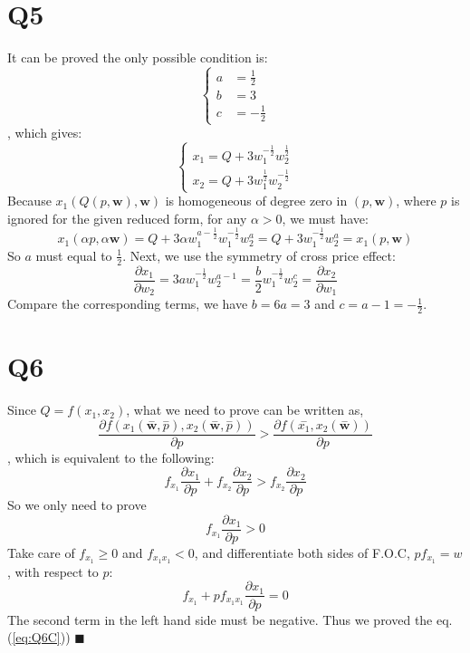 \documentclass{article}
\begin{document}
\section*{Q5}
It can be proved the only possible condition is:
\begin{equation}
	\begin{cases}
		a &= \frac{1}{2}\\
		b &= 3 \\
		c &= -\frac{1}{2}	
	\end{cases}
\end{equation}
, which gives:
\begin{equation}
	\begin{cases}
		x_1 = Q + 3w^{-\frac{1}{2}}_1 w^{\frac{1}{2}}_2		\\
		x_2 = Q + 3w^{\frac{1}{2}}_1 w^{-\frac{1}{2}}_2	
	\end{cases}
\end{equation}
Because $x_1 (Q(p,\bm{w}), \bm{w})$ is homogeneous of degree zero in $(p,\bm{w})$, where $p$ is ignored for the given reduced form, for any $\alpha >0$, we must have:
\begin{equation}
	x_1(\alpha p, \alpha \bm{w}) = Q + 3\alpha w^ {a-\frac{1}{2}}_1 w^{-\frac{1}{2}}_1 w^{a}_2	 = Q + 3w^{-\frac{1}{2}}_1 w^{a}_2 = x_1(p, \bm{w})  
\end{equation}
So $a$ must equal to $\frac{1}{2}$. Next, we use the symmetry of cross price effect:
\begin{equation}
 	\frac{\partial x_1}{\partial w_2} = 3aw^{-\frac{1}{2}}_1 w_2^{a-1} = \frac{b}{2} w^{-\frac{1}{2}}_1 w_2^{c} = \frac{\partial x_2}{\partial w_1}
 \end{equation} 
 Compare the corresponding terms, we have $b = 6a =3 $ and $c=a-1=-\frac{1}{2}$.\quad{$\blacksquare$}


\section*{Q6}
Since $Q = f(x_1,x_2)$, what we need to prove can be written as,
\begin{equation}
	\frac{\partial f(x_1(\overset{-}{\bm{w}},\overset{-}{p}),x_2(\overset{-}{\bm{w}},\overset{-}{p}))}{\partial p} > 
	\frac{\partial f(\overset{-}{x_1}, x_2(\overset{-}{\bm{w}}))}
	{\partial p}
	\end{equation}
, which is equivalent to the following:
\begin{equation}
	f_{x_1}\frac{\partial x_1}{\partial p} +f_{x_2}\frac{\partial x_2}{\partial p}
	> f_{x_2}\frac{\partial x_2}{\partial p}
\end{equation}
So we only need to prove 
\begin{equation}\label{eq:Q6C}
	f_{x_1}\frac{\partial x_1}{\partial p} > 0 
\end{equation}
Take care of $f_{x_1}\geq0$ and $f_{x_1 x_1}<0$, and differentiate both sides of F.O.C, $pf_{x_1} = w$, with respect to $p$:
\begin{equation}
	f_{x_1} + pf_{x_1 x_1} \frac{\partial x_1}{\partial p} = 0
\end{equation}
The second term in the left hand side must be negative. Thus we proved the eq.(\ref{eq:Q6C})) $\blacksquare$

% 
\end{document}
